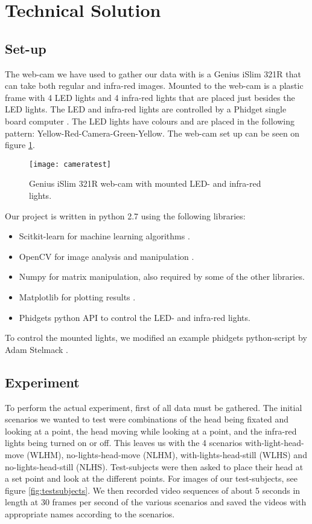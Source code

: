 \section{Technical Solution}
\label{sec:TechnicalSolution}
\subsection{Set-up}
\label{sub:Set-up}
The web-cam we have used to gather our data with is a Genius iSlim 321R that can take both regular and infra-red images.
Mounted to the web-cam is a plastic frame with 4 LED lights and 4 infra-red lights that are placed just besides the LED lights.
The LED and infra-red lights are controlled by a Phidget single board computer \cite{phidgets2012website}.
The LED lights have colours and are placed in the following pattern: Yellow-Red-Camera-Green-Yellow.
The web-cam set up can be seen on figure \ref{fig:webcam}.
\begin{figure}[h!]
\centering
\texttt{[image: cameratest]}
\caption{Genius iSlim 321R web-cam with mounted LED- and infra-red lights.}
\label{fig:webcam}
\end{figure}

Our project is written in python 2.7 using the following libraries: 
\begin{itemize} %
\item{Scitkit-learn for machine learning algorithms \cite{scikitlearn2012website}.}
\item{OpenCV for image analysis and manipulation \cite{opencv2012website}.}
\item{Numpy for matrix manipulation, also required by some of the other libraries\cite{scipy2012website}.}
\item{Matplotlib for plotting results \cite{matplotlib2012website}.}
\item{Phidgets python API to control the LED- and infra-red lights.}
\end{itemize}

To control the mounted lights, we modified an example phidgets python-script by Adam Stelmack \cite{phidgetexample2012download}.

\subsection{Experiment}
\label{sub:Experiment}
To perform the actual experiment, first of all data must be gathered.
The initial scenarios we wanted to test were combinations of the head being fixated and looking at a point, the head moving while looking at a point, and the infra-red lights being turned on or off.
This leaves us with the 4 scenarios with-light-head-move (WLHM), no-lights-head-move (NLHM), with-lights-head-still (WLHS) and no-lights-head-still (NLHS).
Test-subjects were then asked to place their head at a set point and look at the different points. For images of our test-subjects, see figure \ref{fig:testsubjects}.%
We then recorded video sequences of about 5 seconds in length at 30 frames per second of the various scenarios and saved the videos with appropriate names according to the scenarios.

